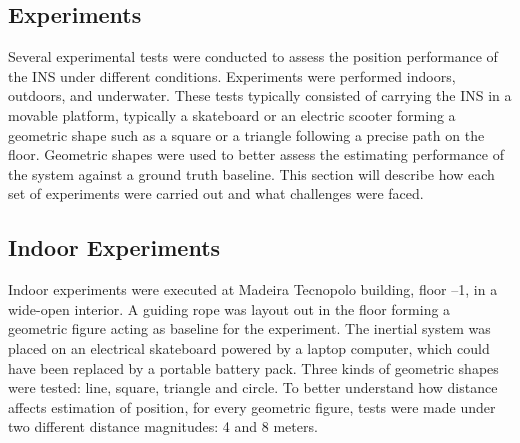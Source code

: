 \newpage




\subsection{Experiments}

Several experimental tests were conducted to assess the position performance of the INS under different conditions. Experiments were performed indoors, outdoors, and underwater. These tests typically consisted of carrying the INS in a movable platform, typically a skateboard or an electric scooter forming a geometric shape such as a square or a triangle following a precise path on the floor. Geometric shapes were used to better assess the estimating performance of the system against a ground truth baseline. This section will describe how each set of experiments were carried out and what challenges were faced.

\subsection{Indoor Experiments}

Indoor experiments were executed at Madeira Tecnopolo building, floor –1, in a wide-open interior. A guiding rope was layout out in the floor forming a geometric figure acting as baseline for the experiment. The inertial system was placed on an electrical skateboard powered by a laptop computer, which could have been replaced by a portable battery pack. Three kinds of geometric shapes were tested: line, square, triangle and circle. To better understand how distance affects estimation of position, for every geometric figure, tests were made under two different distance magnitudes: 4 and 8 meters.

